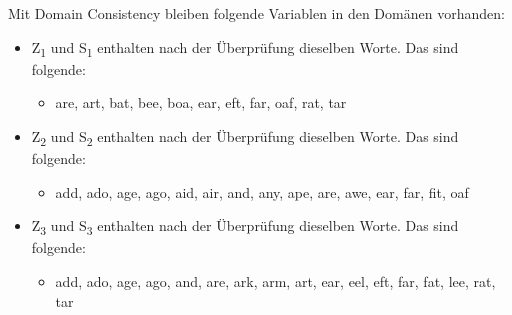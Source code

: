 \documentclass[ngerman]{fbi-aufgabenblatt}
\begin{document}
\newpage

Mit Domain Consistency bleiben folgende Variablen in den Domänen vorhanden:
\begin{itemize}
	\item Z\textsubscript{1} und S\textsubscript{1} enthalten nach der Überprüfung dieselben Worte. Das sind folgende:
	\begin{itemize}
		\item are, art, bat, bee, boa, ear, eft, far, oaf, rat, tar
	\end{itemize}
	\item Z\textsubscript{2} und S\textsubscript{2} enthalten nach der Überprüfung dieselben Worte. Das sind folgende:
	\begin{itemize}
		\item add, ado, age, ago, aid, air, and, any, ape, are, awe, ear, far, fit, oaf
	\end{itemize}
	\item Z\textsubscript{3} und S\textsubscript{3} enthalten nach der Überprüfung dieselben Worte. Das sind folgende:
	\begin{itemize}
		\item add, ado, age, ago, and, are, ark, arm, art, ear, eel, eft, far, fat, lee, rat, tar
	\end{itemize}
\end{itemize}
\end{document}
